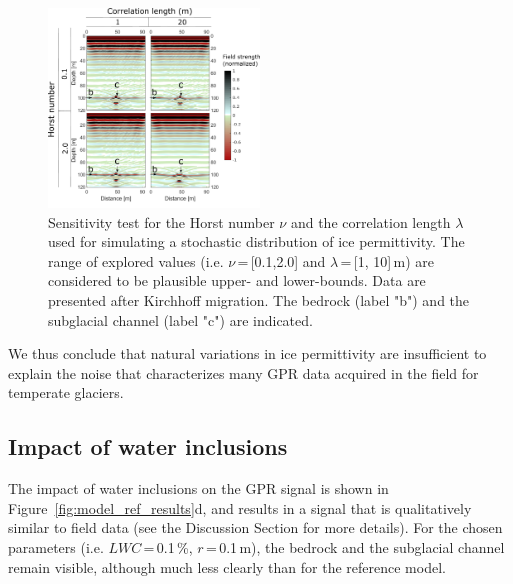 \begin{figure}
    \centering
    \includegraphics[width=0.5\textwidth]{chapters/chapter_gprmax/Fig03.pdf}
    \caption{Sensitivity test for the Horst number $\nu$ and the correlation length $\lambda$ used for simulating a stochastic distribution of ice permittivity. The range of explored values (i.e. $\nu$\,=\,[0.1,2.0] and $\lambda$\,=\,[1, 10]\,m) are considered to be plausible upper- and lower-bounds. Data are presented after Kirchhoff migration. The bedrock (label "b") and the subglacial channel (label "c") are indicated.}
    \label{fig:sensitivity_stoch}
\end{figure}

We thus conclude that natural variations in ice permittivity are insufficient to explain the noise that characterizes many GPR data  acquired in the field for temperate glaciers. 


\subsection{Impact of water inclusions}

The impact of water inclusions on the GPR signal is shown in Figure~\ref{fig:model_ref_results}d, and results in a signal that is qualitatively similar to field data (see the Discussion Section for more details). For the chosen parameters (i.e. $LWC$\,=\,0.1\,\%, $r$\,=\,0.1\,m), the bedrock and the subglacial channel remain visible, although much less clearly than for the reference model. 

